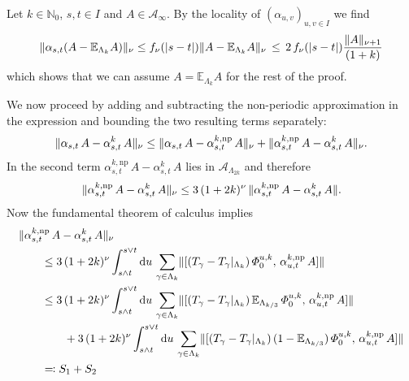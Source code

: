 \documentclass[a4paper]{article}
\newcommand{\E}{\mathbb{E}}
\renewcommand{\Phi}{\varPhi}
\newcommand{\N}{\mathbb{N}}
\newcommand{\mA}{\mathcal{A}}
\newcommand{\dd}{\mathrm{d}}
\DeclarePairedDelimiter\norm{\lVert}{\rVert}
\theoremstyle{plain}
\theoremstyle{definition}
\theoremstyle{remark}
\renewcommand{\(}{\left(}
\renewcommand{\)}{\right)}
\begin{document}
    Let $k\in \N_0$, $s,t\in I$ and $A\in \mA_\infty$. By the locality of $(\alpha_{u,v})_{u,v\in I}$ we find 
    \[
        \norm{\alpha_{s,t}(A- \E_{\Lambda_k}A)}_\nu
        \leq f_\nu(|s-t|) \norm{A- \E_{\Lambda_k}A}_\nu 
        \,\leq\, 
        2\,f_\nu(|s-t|)  \frac{\norm{A}_{\nu+1}}{(1+k)}
    \]
    which shows that we can assume   $A=\E_{\Lambda_k}A$ for the rest of the proof.
     
    We now proceed by adding and subtracting the non-periodic approximation in the expression and bounding the two resulting terms separately:
    \begin{align*}
        \norm{\alpha_{s,t}\, A - \alpha_{s,t}^{k} \, A}_\nu
        \leq
        \norm{\alpha_{s,t}\, A - \alpha_{s,t}^{k,\mathrm{np}} \, A}_\nu 
        +
        \norm{\alpha_{s,t}^{k,\mathrm{np}}\, A - \alpha_{s,t}^{k} \, A}_\nu
        .
    \end{align*}
    In the second term $\alpha_{s,t}^{k,\mathrm{np}}\, A - \alpha_{s,t}^{k} \, A$ lies in $\mA_{\Lambda_{2k}}$ and therefore 
    \begin{align*}
        \norm{\alpha_{s,t}^{k,\mathrm{np}}\, A - \alpha_{s,t}^{k} \, A}_\nu
        \leq
        3\,(1+2k)^\nu \, \norm{\alpha_{s,t}^{k,\mathrm{np}}\, A - \alpha_{s,t}^{k} \, A}
        .
    \end{align*}
    Now the fundamental theorem of calculus implies
    \begin{align*}
        \hspace{2em}&\hspace{-2em}
        \norm{\alpha_{s,t}^{k,\mathrm{np}}\, A - \alpha_{s,t}^{k} \, A}_\nu
        \\
        &\leq
        3\,(1+2k)^\nu \int_{s\land t}^{s\lor t} \dd u \, \sum_{\gamma \in \Lambda_k} \norm{[(T_\gamma - T_\gamma|_{\Lambda_k})\,  \Phi_0^{u,k}, \, \alpha_{u,t}^{k,\mathrm{np}} \, A] }
        \\
        &\leq 
        3\,(1+2k)^\nu \int_{s\land t}^{s\lor t} \dd u \, \sum_{\gamma \in \Lambda_k} \norm{[(T_\gamma - T_\gamma|_{\Lambda_k})\, \E_{\Lambda_{k/3}} \, \Phi_0^{u,k}, \, \alpha_{u,t}^{k,\mathrm{np}} \, A] }
        \\
        &\hspace{2em}+ 
        3\,(1+2k)^\nu \int_{s\land t}^{s\lor t} \dd u \, \sum_{\gamma \in \Lambda_k} \norm{[(T_\gamma - T_\gamma|_{\Lambda_k})\, (1 - \E_{\Lambda_{k/3}}) \, \Phi_0^{u,k}, \, \alpha_{u,t}^{k,\mathrm{np}} \, A] }
        \\
        & \eqcolon S_1 + S_2
    \end{align*}
\end{document}
